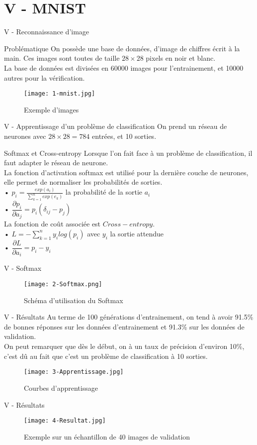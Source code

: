 
\section{V - MNIST}
\begin{frame}{V - Reconnaissance d'image}
\begin{block}{Problématique}
On possède une base de données, d'image de chiffres écrit à la main. Ces images sont toutes de taille $28 \times 28$ pixels en noir et blanc. \\
La base de données est divisées en 60000 images pour l'entrainement, et 10000 autres pour la vérification.
\end{block}
\begin{figure}
	\centering
    \texttt{[image: 1-mnist.jpg]}
	\caption{Exemple d'images}
\end{figure}
\end{frame}

\begin{frame}{V - Apprentissage d'un problème de classification}
On prend un réseau de neurones avec $28 \times 28 = 784$ entrées, et 10 sorties. \\
\begin{block}{Softmax et Cross-entropy}
Lorsque l'on fait face à un problème de classification, il faut adapter le réseau de neurone. \\
La fonction d'activation softmax est utilisé pour la dernière couche de neurones, elle permet de normaliser les probabilités de sorties. \\
• $p_i = \frac{exp(a_i)}{\sum_{k=1}^{n}exp(e_k)}$ la probabilité de la sortie $a_i$ \\
• $\dfrac{\partial p_i}{\partial a_j} = p_i(\delta_{ij}-p_j)$ \\
La fonction de coût associée est $Cross-entropy$. \\
• $L = -\sum_{k=1}^{n}y_ilog(p_i)$ avec $y_i$ la sortie attendue \\
• $\dfrac{\partial L}{\partial a_i} = p_i - y_i$
\end{block}
\end{frame}

\begin{frame}{V - Softmax}
\begin{figure}
	\centering
    \texttt{[image: 2-Softmax.png]}
	\caption{Schéma d'utilisation du Softmax}
\end{figure}
\end{frame}

\begin{frame}{V - Résultats}
Au terme de 100 générations d'entrainement, on tend à avoir 91.5\% de bonnes réponses sur les données d'entrainement et 91.3\% sur les données de validation. \\
On peut remarquer que dès le début, on à un taux de précision d'environ 10\%, c'est dû au fait que c'est un problème de classification à 10 sorties.
\begin{figure}
	\centering
    \texttt{[image: 3-Apprentissage.jpg]}
	\caption{Courbes d'apprentissage}
\end{figure}
\end{frame}

\begin{frame}{V - Résultats}
\begin{figure}
	\centering
    \texttt{[image: 4-Resultat.jpg]}
	\caption{Exemple sur un échantillon de 40 images de validation}
\end{figure}
\end{frame}